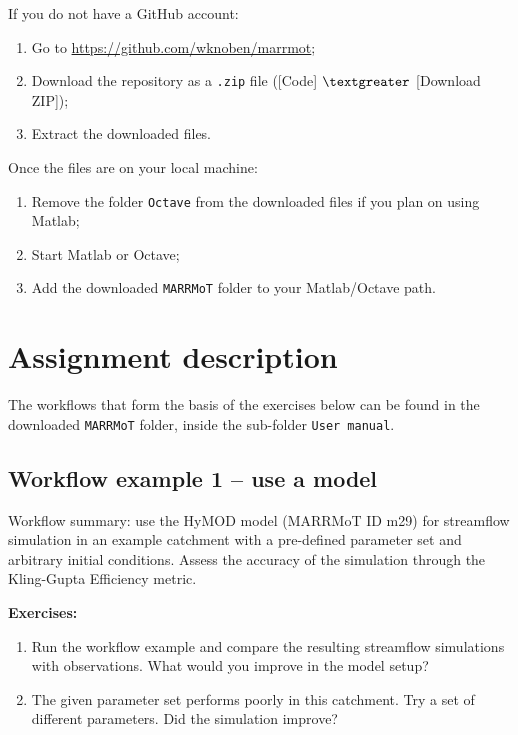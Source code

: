 \documentclass[12pt]{article}
\begin{document}
\noindent
If you do not have a GitHub account:

\begin{enumerate}
	\item Go to \url{https://github.com/wknoben/marrmot};
	\item Download the repository as a \texttt{.zip} file ([Code] $\textgreater$ [Download ZIP]);
	\item Extract the downloaded files.
\end{enumerate}

\noindent
Once the files are on your local machine:

\begin{enumerate}
	\item Remove the folder \texttt{Octave} from the downloaded files if you plan on using Matlab;
	\item Start Matlab or Octave;
	\item Add the downloaded \texttt{MARRMoT} folder to your Matlab/Octave path.
\end{enumerate}


\section{Assignment description}

The workflows that form the basis of the exercises below can be found in the downloaded \texttt{MARRMoT} folder, inside the sub-folder \texttt{User manual}.

%
\subsection{Workflow example 1 – use a model}

Workflow summary: use the HyMOD model (MARRMoT ID m29) for streamflow simulation in an example catchment with a pre-defined parameter set and arbitrary initial conditions. Assess the accuracy of the simulation through the Kling-Gupta Efficiency metric. 

\medskip \noindent
\textbf{Exercises:}
\begin{enumerate}
	\item Run the workflow example and compare the resulting streamflow simulations with observations. What would you improve in the model setup?
	\item The given parameter set performs poorly in this catchment. Try a set of different parameters. Did the simulation improve?
\end{enumerate}
\end{document}
